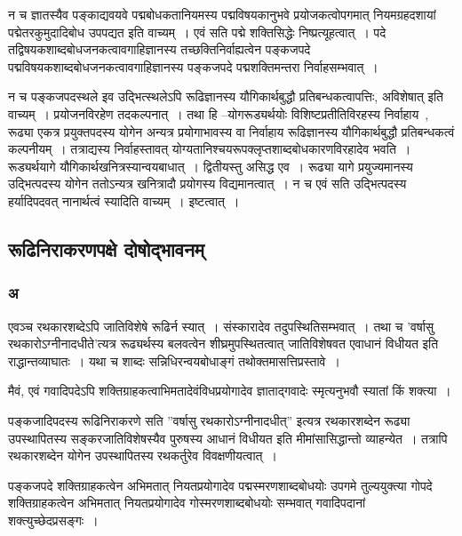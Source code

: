 				न च ज्ञातस्यैव पङ्काद्यवयवे पद्मबोधकतानियमस्य पद्मविषयकानुभवे प्रयोजकत्वोपगमात् नियमग्रहदशायां पद्मेतरकुमुदादिबोध उपपद्यत इति वाच्यम्~। एवं सति पद्मे शक्तिसिद्धेः निष्प्रत्यूहत्वात्~। पदे तद्विषयकशाब्दबोधजनकत्वावगाहिज्ञानस्य  तच्छक्तिनिर्वाह्यत्वेन पङ्कजपदे पद्मविषयकशाब्दबोधजनकत्वावगाहिज्ञानस्य पङ्कजपदे पद्मशक्तिमन्तरा निर्वाहसम्भवात्~।

				न च पङ्कजपदस्थले इव उद्भित्स्थलेऽपि  रूढिज्ञानस्य यौगिकार्थबुद्धौ प्रतिबन्धकत्वापत्तिः, अविशेषात् इति वाच्यम्~। प्रयोजनविरहेण तदकल्पनात्~। तथा हि –योगरूड्यर्थयोः विशिष्टप्रतीतिविरहस्य निर्वाहाय~, रूढ्या एकत्र प्रयुक्तपदस्य योगेन अन्यत्र प्रयोगाभावस्य वा निर्वाहाय रूढिज्ञानस्य  यौगिकार्थबुद्धौ प्रतिबन्धकत्वं कल्पनीयम्~। तत्राद्यस्य निर्वाहस्तावत्  योग्यतानिश्चयरूपक्लृप्तशाब्दबोधकारणविरहादेव भवति~। रूड्यर्थयागे यौगिकार्थखनित्रस्यान्वयबाधात्~। द्वितीयस्तु असिद्ध एव~। रूढ्या यागे प्रयुज्यमानस्य उद्भित्पदस्य  योगेन ततोऽन्यत्र खनित्रादौ प्रयोगस्य विद्यमानत्वात्~। न च एवं सति उद्भित्पदस्य हर्यादिपदवत्  नानार्थत्वं स्यादिति वाच्यम्~। इष्टत्वात्~। 

		\subsection{रूढिनिराकरणपक्षे दोषोद्भावनम्}

			\subsubsection{अ}
			
				\begin{small}
				
					एवञ्च रथकारशब्देऽपि जातिविशेषे रूढिर्न स्यात्~। संस्कारादेव तदुपस्थितिसम्भवात्~। तथा च ’वर्षासु रथकारोऽग्नीनादधीते’त्यत्र रूढ्यर्थस्य बलवत्वेन शीघ्रमुपस्थितत्वात् जातिविशेषवत एवाधानं विधीयत इति राद्धान्तव्याघातः~। यथा च शाब्दः सन्निधिरन्वयबोधाङ्गं तथोक्तमासत्तिप्रस्तावे~।
			
					मैवं, एवं गवादिपदेऽपि शक्तिग्राहकत्वाभिमतादेवंविधप्रयोगादेव ज्ञाताद्गवादेः स्मृत्यनुभवौ स्यातां किं शक्त्या~। 
				\end{small}
			
				पङ्कजादिपदस्य रूढिनिराकरणे सति  ”वर्षासु रथकारोऽग्नीनादधीत्”  इत्यत्र रथकारशब्देन रूढ्या उपस्थापितस्य सङ्करजातिविशेषस्यैव पुरुषस्य आधानं विधीयत इति मीमांसासिद्धान्तो व्याहन्येत~। तत्रापि रथकारशब्देन योगेन उपस्थापितस्य रथकर्तुरेव विवक्षणीयत्वात्~।
			
				पङ्कजपदे शक्तिग्राहकत्वेन अभिमतात् नियतप्रयोगादेव पद्मस्मरणशाब्दबोधयोः उपगमे तुल्ययुक्त्या गोपदे शक्तिग्राहकत्वेन अभिमतात् नियतप्रयोगादेव गोस्मरणशाब्दबोधयोः सम्भवात् गवादिपदानां शक्त्युच्छेदप्रसङ्गः~। 
			
